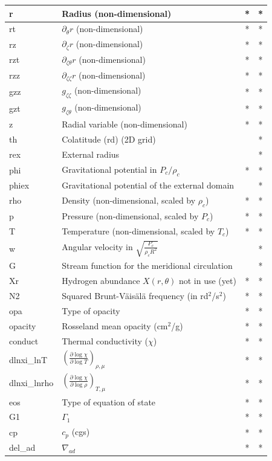 \begin{longtable}{|l|p{8cm}|c|c|}
\hline
r&Radius (non-dimensional) &*&*\\
\hline
rt& $\partial_\theta r$ (non-dimensional) &*&*\\
\hline
rz& $\partial_\zeta r$ (non-dimensional) &*&*\\
\hline
rzt& $\partial_{\zeta\theta} r$ (non-dimensional) &*&*\\
\hline
rzz& $\partial_{\zeta\zeta} r$ (non-dimensional) &*&*\\
\hline
gzz& $g_{\zeta\zeta}$ (non-dimensional) &*&*\\
\hline
gzt& $g_{\zeta\theta}$ (non-dimensional) &*&*\\
\hline
z&Radial variable (non-dimensional)&*&*\\
\hline
th&Colatitude (rd) (2D grid) &&*\\
\hline
rex&External radius&&*\\
\hline
phi&Gravitational potential in $P_c/\rho_c$ &*&*\\
\hline
phiex&Gravitational potential of the external domain&&*\\
\hline
rho&Density (non-dimensional, scaled by $\rho_c$)&*&*\\
\hline
p&Pressure (non-dimensional, scaled by $P_c$)&*&*\\
\hline
T&Temperature (non-dimensional, scaled by $T_c$)&*&*\\
\hline
w&Angular velocity in $\sqrt{\frac{P_c}{\rho_cR^2}}$&&*\\
\hline
G&Stream function for the meridional circulation&&*\\
\hline
Xr&Hydrogen abundance $X(r,\theta)$ not in use (yet) &*&*\\
\hline
N2&Squared Brunt-V\"ais\"al\"a frequency (in rd$^2$/s$^2$)&*&*\\
\hline
opa&Type of opacity&*&*\\
\hline
opacity&Rosseland mean opacity (cm$^2$/g) &*&*\\
\hline
conduct&Thermal conductivity ($\chi$)&*&*\\
\hline
dlnxi\_lnT&$\left(\frac{\partial\log\chi}{\partial\log T}\right)_{\rho,\mu}$&*&*\\
\hline
dlnxi\_lnrho&$\left(\frac{\partial\log\chi}{\partial\log\rho}\right)_{T,\mu}$&*&*\\
\hline
eos&Type of equation of state&*&*\\
\hline
G1&$\Gamma_1$&*&*\\
\hline
cp&$c_p$ (cgs) &*&*\\
\hline
del\_ad&$\nabla_{ad}$&*&*\\

\end{longtable}
